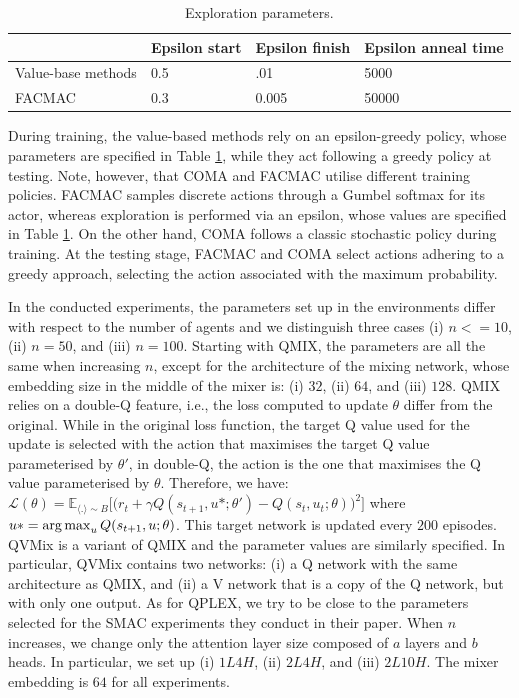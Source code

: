 \begin{table}
    \caption{Exploration parameters.}
    \centering
    \setlength\tabcolsep{4.5pt}
    \begin{tabular}{llll}
    \toprule
    & Epsilon start & Epsilon finish & Epsilon anneal time \\
    \midrule
    Value-base methods & 0.5  & .01 & 5000\\
    FACMAC & 0.3 & 0.005 & 50000 \\
    \bottomrule
    \end{tabular}
    \label{tab:exloration_param}
\end{table}

During training, the value-based methods rely on an epsilon-greedy policy, whose parameters are specified in Table \ref{tab:exloration_param}, while they act following a greedy policy at testing.
Note, however, that COMA and FACMAC utilise different training policies.
FACMAC samples discrete actions through a Gumbel softmax for its actor, whereas exploration is performed via an epsilon, whose values are specified in Table \ref{tab:exloration_param}.
On the other hand, COMA follows a classic stochastic policy during training.
At the testing stage, FACMAC and COMA select actions adhering to a greedy approach, selecting the action associated with the maximum probability.

In the conducted experiments, the parameters set up in the environments differ with respect to the number of agents and we distinguish three cases (i) $n<=10$, (ii) $n=50$, and (iii) $n=100$.
Starting with QMIX, the parameters are all the same when increasing $n$, except for the architecture of the mixing network, whose embedding size in the middle of the mixer is: (i) $32$, (ii) $64$, and (iii) $128$.
QMIX relies on a double-Q feature, i.e., the loss computed to update $\theta$ differ from the original.
While in the original loss function, the target Q value used for the update is selected with the action that maximises the target Q value parameterised by $\theta'$, in double-Q, the action is the one that maximises the Q value parameterised by $\theta$.
Therefore, we have: $\mathcal{L}(\theta) = \mathbb{E}_{\langle . \rangle\sim B} \big[\big(r_{t} + \gamma Q(s_{t+1}, u*; \theta')- Q(s_{t}, u_{t}; \theta)\big)^{2}\big]$ where $u*=\operatorname*{arg\,max}_u Q(s_{t+1}, u; \theta)$.
This target network is updated every $200$ episodes.
QVMix is a variant of QMIX and the parameter values are similarly specified.
In particular, QVMix contains two networks: (i) a Q network with the same architecture as QMIX, and (ii) a V network that is a copy of the Q network, but with only one output.
As for QPLEX, we try to be close to the parameters selected for the SMAC experiments they conduct in their paper.
When $n$ increases, we change only the attention layer size composed of $a$ layers and $b$ heads.
In particular, we set up (i) $1L4H$, (ii) $2L4H$, and (iii) $2L10H$.
The mixer embedding is $64$ for all experiments.


